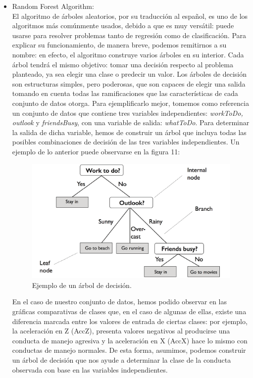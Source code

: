 \documentclass[runningheads]{llncs}
\begin{document}
\begin{itemize}
    \item Random Forest Algorithm:\\
    El algoritmo de árboles aleatorios, por su traducción al español, es uno de los algoritmos más comúnmente usados, debido a que es muy versátil: puede usarse para resolver problemas tanto de regresión como de clasificación. Para explicar su funcionamiento, de manera breve, podemos remitirnos a su nombre: en efecto, el algoritmo construye varios árboles en su interior. Cada árbol tendrá el mismo objetivo: tomar una decisión respecto al problema planteado, ya sea elegir una clase o predecir un valor. Los árboles de decisión son estructuras simples, pero poderosas, que son capaces de elegir una salida tomando en cuenta todas las ramificaciones que las características de cada conjunto de datos otorga. Para ejemplificarlo mejor, tomemos como referencia un conjunto de datos que contiene tres variables independientes: \textit{workToDo, outlook} y \textit{friendsBusy}, con una variable de salida: \textit{whatToDo}. Para determinar la salida de dicha variable, hemos de construir un árbol que incluya todas las posibles combinaciones de decisión de las tres variables independientes. Un ejemplo de lo anterior puede observarse en la figura 11:
    
    \begin{figure}
        \centering
        \includegraphics[width=0.7\columnwidth]{Decision_Tree_Example.jpg}
        \caption{Ejemplo de un árbol de decisión.}
        \label{fig:comand}%
    \end{figure}
    
    En el caso de nuestro conjunto de datos, hemos podido observar en las gráficas comparativas de clases que, en el caso de algunas de ellas, existe una diferencia marcada entre los valores de entrada de ciertas clases: por ejemplo, la aceleración en Z (AccZ), presenta valores negativos al producirse una conducta de manejo agresiva y la aceleración en X (AccX) hace lo mismo con conductas de manejo normales. De esta forma, asumimos, podemos construir un árbol de decisión que nos ayude a determinar la clase de la conducta observada con base en las variables independientes. 
    \newpage
    

\end{itemize}
\end{document}
